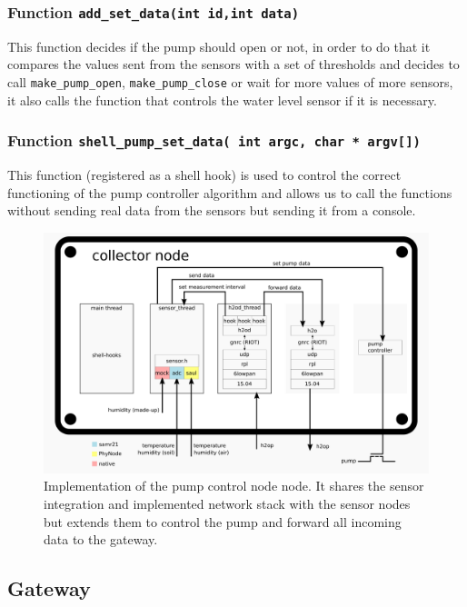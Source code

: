 \documentclass[11pt,paper=a4,parskip=half]{scrartcl}
\begin{document}
\subsubsection{Function \texttt{add\_set\_data(int id,int data)}}

This function decides if the pump should open or not, in order to do that it
compares the values sent from the sensors with a set of thresholds and
decides to call \texttt{make\_pump\_open}, \texttt{make\_pump\_close} or wait
for more values of more sensors, it also calls the function that controls the
water level sensor if it is necessary.

\subsubsection{Function \texttt{shell\_pump\_set\_data( int argc, char * argv[])}}

This function (registered as a shell hook) is used to control the correct
functioning of the pump controller algorithm and allows us to call the
functions without sending real data from the sensors but sending it from a console.

  \begin{figure}[h]
    \centering
    \includegraphics[width=\textwidth]{stack-collector}
	  \caption{Implementation of the pump control node node. It shares the sensor
	  integration and implemented network stack with the sensor nodes but
	  extends them to control the pump and forward all incoming data to the
	  gateway.}
    \label{fig:stack_sensor}
  \end{figure}

\subsection{Gateway}
\end{document}
